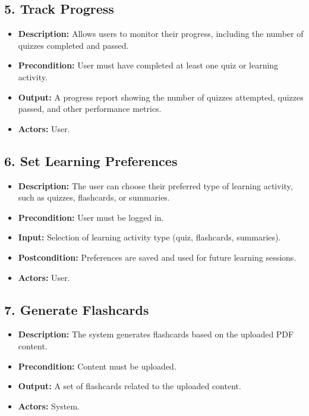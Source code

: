 \documentclass{article}
\begin{document}
\subsection*{5. Track Progress}
\begin{itemize}[left=0pt]
    \item \textbf{Description:} Allows users to monitor their progress, including the number of quizzes completed and passed.
    \item \textbf{Precondition:} User must have completed at least one quiz or learning activity.
    \item \textbf{Output:} A progress report showing the number of quizzes attempted, quizzes passed, and other performance metrics.
    \item \textbf{Actors:} User.
\end{itemize}

\subsection*{6. Set Learning Preferences}
\begin{itemize}[left=0pt]
    \item \textbf{Description:} The user can choose their preferred type of learning activity, such as quizzes, flashcards, or summaries.
    \item \textbf{Precondition:} User must be logged in.
    \item \textbf{Input:} Selection of learning activity type (quiz, flashcards, summaries).
    \item \textbf{Postcondition:} Preferences are saved and used for future learning sessions.
    \item \textbf{Actors:} User.
\end{itemize}

\subsection*{7. Generate Flashcards}
\begin{itemize}[left=0pt]
    \item \textbf{Description:} The system generates flashcards based on the uploaded PDF content.
    \item \textbf{Precondition:} Content must be uploaded.
    \item \textbf{Output:} A set of flashcards related to the uploaded content.
    \item \textbf{Actors:} System.
\end{itemize}
\end{document}
